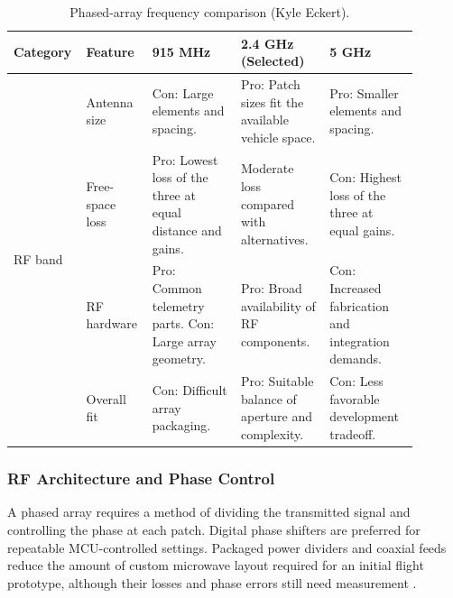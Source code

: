 \documentclass[11pt]{IEEEtran}
\begin{document}
\begin{table}[H]
\centering\small
\begin{tabular}{@{}p{0.115\linewidth}p{0.145\linewidth}p{0.21\linewidth}p{0.21\linewidth}p{0.21\linewidth}@{}}
\toprule
\textbf{Category} & \textbf{Feature} & \textbf{915 MHz} & \textbf{2.4 GHz (Selected)} & \textbf{5 GHz} \\
\midrule
\multirow{4}{*}{RF band}
 & Antenna size & Con: Large elements and spacing. & Pro: Patch sizes fit the available vehicle space. & Pro: Smaller elements and spacing. \\ \cmidrule{2-5}
 & Free-space loss & Pro: Lowest loss of the three at equal distance and gains. & Moderate loss compared with alternatives. & Con: Highest loss of the three at equal gains. \\ \cmidrule{2-5}
 & RF hardware & Pro: Common telemetry parts. Con: Large array geometry. & Pro: Broad availability of RF components. & Con: Increased fabrication and integration demands. \\ \cmidrule{2-5}
 & Overall fit & Con: Difficult array packaging. & Pro: Suitable balance of aperture and complexity. & Con: Less favorable development tradeoff. \\
\bottomrule
\end{tabular}
\vspace{3mm}
\caption{Phased-array frequency comparison (Kyle Eckert).}
\label{tab:Frequency_Comparison}
\end{table}

\subsubsection{RF Architecture and Phase Control}
A phased array requires a method of dividing the transmitted signal and controlling the phase at each patch. Digital phase shifters are preferred for repeatable MCU-controlled settings. Packaged power dividers and coaxial feeds reduce the amount of custom microwave layout required for an initial flight prototype, although their losses and phase errors still need measurement \cite{phased,wilkinson,rfLaminate}.
\end{document}
